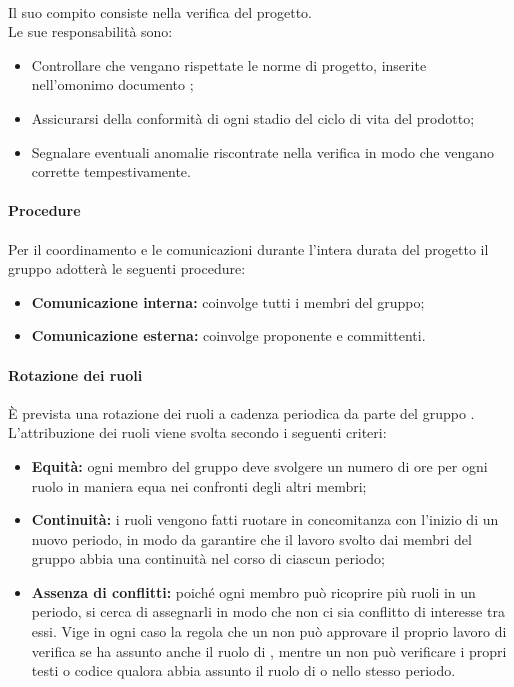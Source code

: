 \paragraph*{\roleVerifier}
Il suo compito consiste nella verifica del progetto.\\
Le sue responsabilità sono:
\begin{itemize}
  \item Controllare che vengano rispettate le norme di progetto, inserite nell'omonimo documento \docNameVersionNdP{};
  \item Assicurarsi della conformità di ogni stadio del ciclo di vita\glo{} del prodotto;
  \item Segnalare eventuali anomalie riscontrate nella verifica in modo che vengano corrette tempestivamente.
\end{itemize}
\paragraph {Procedure}
Per il coordinamento e le comunicazioni durante l'intera durata del progetto il gruppo \groupName{} adotterà le seguenti procedure:
\begin{itemize}
  \item \textbf{Comunicazione interna:} coinvolge tutti i membri del gruppo;
  \item  \textbf{Comunicazione esterna:} coinvolge proponente e committenti.
\end{itemize}


\paragraph{Rotazione dei ruoli}
È prevista una rotazione dei ruoli a cadenza periodica da parte del gruppo \groupName{}.\\
L'attribuzione dei ruoli viene svolta secondo i seguenti criteri:
\begin{itemize}
  \item \textbf{Equità:} ogni membro del gruppo deve svolgere un numero di ore per ogni ruolo in maniera equa nei confronti degli altri membri;
  \item \textbf{Continuità:} i ruoli vengono fatti ruotare in concomitanza con l'inizio di un nuovo periodo, in modo da garantire che il lavoro svolto dai membri del gruppo abbia una continuità nel corso di ciascun periodo;
  \item \textbf{Assenza di conflitti:} poiché ogni membro può ricoprire più ruoli in un periodo, si cerca di assegnarli in modo che non ci sia conflitto di interesse tra essi. Vige in ogni caso la regola che un \roleProjectManagerLow{} non può approvare il proprio lavoro di verifica se ha assunto anche il ruolo di \roleVerifierLow{}, mentre un \roleVerifierLow{} non può verificare i propri testi o codice qualora abbia assunto il ruolo di \roleAnalystLow{} o \roleProgrammerLow{} nello stesso periodo.
\end{itemize}


